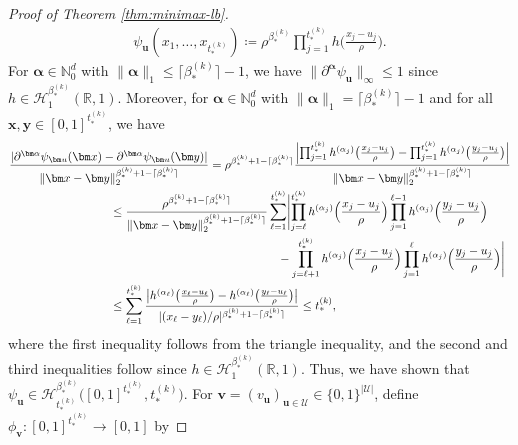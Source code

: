 \documentclass[12pt]{article}
\begin{document}
\begin{proof}[Proof of Theorem \ref{thm:minimax-lb}]
    \begin{align*}
        \psi_{\bm u}(x_1,\ldots,x_{t_*^{(k)}}) \coloneqq \rho^{\beta_*^{(k)}}\prod_{j=1}^{t_*^{(k)}} h\biggl(\frac{x_j-u_j}{\rho}\biggr).
    \end{align*}
    For $\bm\alpha \in \mathbb{N}_0^d$ with $\|\bm\alpha\|_1 \leq \lceil \beta_*^{(k)} \rceil - 1$, we have $\|\partial^{\bm\alpha} \psi_{\bm u}\|_{\infty} \leq 1$ since $h \in \mathcal{H}_1^{\beta^{(k)}_*}(\mathbb{R},1)$.  Moreover, for $\bm\alpha \in \mathbb{N}_0^d$ with $\|\bm\alpha\|_1 = \lceil \beta_*^{(k)} \rceil - 1$ and for all $\bm x,\bm y \in [0,1]^{t_*^{(k)}}$, we have
    \begin{align*}
        &\frac{|\partial^{\bm\alpha} \psi_{\bm u}(\bm x) - \partial^{\bm\alpha} \psi_{\bm u}(\bm y)|}{\|\bm x - \bm y\|_2^{\beta_*^{(k)}+1-\lceil\beta_*^{(k)}\rceil}} = \rho^{\beta_*^{(k)}+1-\lceil\beta_*^{(k)}\rceil} \frac{\Bigl| \prod_{j=1}^{t_*^{(k)}} h^{(\alpha_j)}\bigl(\frac{x_j-u_j}{\rho}\bigr) - \prod_{j=1}^{t_*^{(k)}} h^{(\alpha_j)}\bigl(\frac{y_j-u_j}{\rho}\bigr) \Bigr|}{\|\bm x - \bm y\|_2^{\beta_*^{(k)}+1-\lceil\beta_*^{(k)}\rceil}}\\
        &\hspace{3cm} \leq \frac{\rho^{\beta_*^{(k)}+1-\lceil\beta_*^{(k)}\rceil}}{\|\bm x - \bm y\|_2^{\beta_*^{(k)}+1-\lceil\beta_*^{(k)}\rceil}} \sum_{\ell=1}^{t_*^{(k)}}\Biggl| \prod_{j=\ell}^{t_*^{(k)}} h^{(\alpha_j)}\Bigl(\frac{x_j-u_j}{\rho}\Bigr)\prod_{j=1}^{\ell-1} h^{(\alpha_j)}\Bigl(\frac{y_j-u_j}{\rho}\Bigr)\\
        &\hspace{8cm} - \prod_{j=\ell+1}^{t_*^{(k)}} h^{(\alpha_j)}\Bigl(\frac{x_j-u_j}{\rho}\Bigr)\prod_{j=1}^{\ell} h^{(\alpha_j)}\Bigl(\frac{y_j-u_j}{\rho}\Bigr) \Biggr|\\
        &\hspace{3cm} \leq \sum_{\ell=1}^{t_*^{(k)}} \frac{\bigl| h^{(\alpha_\ell)}\bigl(\frac{x_\ell-u_\ell}{\rho}\bigr) - h^{(\alpha_\ell)}\bigl(\frac{y_\ell-u_\ell}{\rho}\bigr) \bigr|}{|(x_\ell - y_\ell)/\rho|^{\beta_*^{(k)}+1-\lceil\beta_*^{(k)}\rceil}} \leq t_*^{(k)},
    \end{align*}
    where the first inequality follows from the triangle inequality, and the second and third inequalities follow since $h \in \mathcal{H}_1^{\beta^{(k)}_*}(\mathbb{R},1)$. Thus, we have shown that $\psi_{\bm u} \in \mathcal{H}_{t_*^{(k)}}^{\beta_*^{(k)}}\bigl([0,1]^{t_*^{(k)}}, t_*^{(k)}\bigr)$. For $\bm v = (v_{\bm u})_{\bm u \in \mathcal{U}} \in \{0,1\}^{|\mathcal{U}|}$, define $\phi_{\bm v} : [0,1]^{t_*^{(k)}} \to [0,1]$ by

\end{proof}
\end{document}
